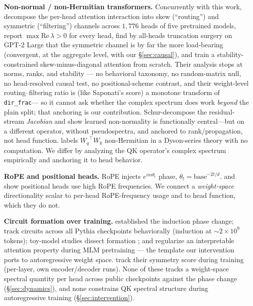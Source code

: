 \documentclass[11pt]{article}
\newcommand{\dirfrac}{\texttt{dir\_frac}\xspace}
\newcommand{\Wq}{\ensuremath{W_q}}
\newcommand{\Wk}{\ensuremath{W_k}}
\newcommand{\Rope}{RoPE\xspace}
\begin{document}
\textbf{Non-normal / non-Hermitian transformers.} Concurrently with this work, \citet{jamil2026routing} decompose
the per-head attention interaction into skew (``routing'') and symmetric (``filtering'') channels across $1{,}776$
heads of five pretrained models, report $\max\mathrm{Re}\,\lambda>0$ for every head, find by all-heads truncation
surgery on GPT-2 Large that the symmetric channel is by far the more load-bearing (convergent, at the aggregate
level, with our \S\ref{sec:causal}), and train a stability-constrained skew-minus-diagonal attention from scratch.
Their analysis stops at norms, ranks, and stability --- no behavioral taxonomy, no random-matrix null, no
head-resolved causal test, no positional-scheme contrast, and their weight-level routing--filtering ratio is (like
Saponati's score) a monotone transform of \dirfrac --- so it cannot ask whether the complex spectrum does work
\emph{beyond} the plain split; that anchoring is our contribution. \citet{fernando2026dynamics} Schur-decompose the residual-stream
\emph{Jacobian} and show learned non-normality is functionally central---but on a different operator, without
pseudospectra, and anchored to rank/propagation, not head function. \citet{chang2026dyson} labels $\Wq^\top\Wk$
non-Hermitian in a Dyson-series theory with no computation. We differ by analyzing the QK operator's complex spectrum
empirically and anchoring it to head behavior.

\textbf{RoPE and positional heads.} \Rope \citep{su2021roformer} injects $e^{im\theta_t}$ phase,
$\theta_t=\mathrm{base}^{-2t/d}$. \citet{barbero2025rope} and \citet{urrutia2025decoupling} show positional heads use
high \Rope frequencies. We connect a \emph{weight-space} directionality scalar to per-head \Rope-frequency usage and to
head function, which they do not.

\textbf{Circuit formation over training.} \citet{olsson2022induction} established the induction phase change;
\citet{tigges2024llm} track circuits across all Pythia checkpoints behaviorally (induction at ${\sim}2{\times}10^9$
tokens); toy-model studies dissect formation \citep{bietti2023birth,reddy2024mechanistic,singh2024needs}; and
\citet{chen2024sudden} regularize an interpretable attention property during MLM pretraining --- the template our
intervention ports to autoregressive weight space. \citet{saponati2025} track their symmetry score during training
(per-layer, own encoder/decoder runs). None of these tracks a weight-space spectral quantity per head across public
checkpoints against the phase change (\S\ref{sec:dynamics}), and none constrains QK spectral structure during
autoregressive training (\S\ref{sec:intervention}).
\end{document}
